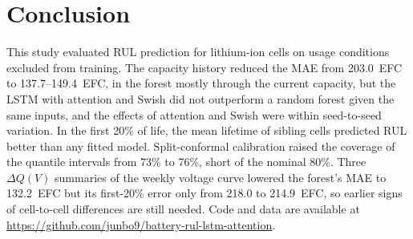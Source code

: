 \documentclass[conference]{IEEEtran}
\begin{document}
\section{Conclusion}
This study evaluated RUL prediction for lithium-ion cells on usage conditions excluded from training. The capacity history reduced the MAE from 203.0~EFC to 137.7--149.4~EFC, in the forest mostly through the current capacity, but the LSTM with attention and Swish did not outperform a random forest given the same inputs, and the effects of attention and Swish were within seed-to-seed variation. In the first 20\% of life, the mean lifetime of sibling cells predicted RUL better than any fitted model. Split-conformal calibration raised the coverage of the quantile intervals from 73\% to 76\%, short of the nominal 80\%. Three $\Delta Q(V)$ summaries of the weekly voltage curve lowered the forest's MAE to 132.2~EFC but its first-20\% error only from 218.0 to 214.9~EFC, so earlier signs of cell-to-cell differences are still needed. Code and data are available at \url{https://github.com/junbo9/battery-rul-lstm-attention}.
\end{document}
